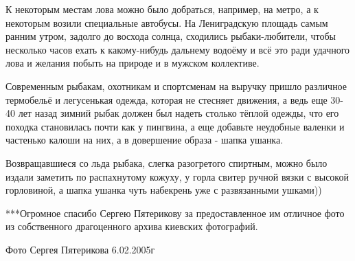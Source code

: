 К некоторым местам лова можно было добраться, например, на метро, а к некоторым
возили специальные автобусы. На Лениградскую площадь самым ранним утром,
задолго до восхода солнца, сходились рыбаки-любители, чтобы несколько часов
ехать к какому-нибудь дальнему водоёму и всё это ради удачного лова и желания
побыть на природе и в мужском коллективе.

Современным рыбакам, охотникам и спортсменам на выручку пришло различное
термобельё и легусенькая одежда, которая не стесняет движения, а ведь еще 30-40
лет назад зимний рыбак должен был надеть столько тёплой одежды, что его походка
становилась почти как у пингвина, а еще добавьте неудобные валенки и частенько
калоши на них, а в довершение образа - шапка ушанка. 

Возвращавшиеся со льда рыбака, слегка разогретого  спиртным, можно было издали
заметить по распахнутому кожуху, у горла свитер ручной вязки с высокой
горловиной, а шапка ушанка чуть набекрень уже с развязанными ушками))

***Огромное спасибо Сергею Пятерикову за предоставленное им отличное фото из
собственного драгоценного архива киевских фотографий. 

Фото Сергея Пятерикова 6.02.2005г

